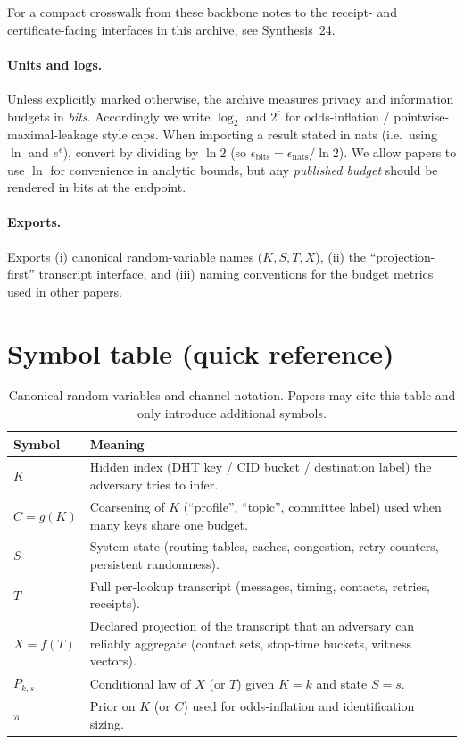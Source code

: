 \documentclass[11pt]{article}
\begin{document}
\noindent For a compact crosswalk from these backbone notes to the receipt- and certificate-facing interfaces in this archive, see Synthesis~24.\cite{series:mathcrosswalk}

\paragraph{Units and logs.}
Unless explicitly marked otherwise, the archive measures privacy and information budgets in \emph{bits}.
Accordingly we write $\log_2$ and $2^{\epsilon}$ for odds-inflation / pointwise-maximal-leakage style caps.
When importing a result stated in nats (i.e.\ using $\ln$ and $e^{\epsilon}$), convert by dividing by $\ln 2$ (so $\epsilon_{\mathrm{bits}}=\epsilon_{\mathrm{nats}}/\ln 2$).
We allow papers to use $\ln$ for convenience in analytic bounds, but any \emph{published budget} should be rendered in bits at the endpoint.

\paragraph{Exports.}
Exports (i) canonical random-variable names ($K,S,T,X$), (ii) the ``projection-first'' transcript interface, and (iii) naming conventions for the budget metrics used in other papers.

\section{Symbol table (quick reference)}
\begin{table}[t]
\centering
\begin{tabularx}{\linewidth}{@{}lX@{}}
\toprule
Symbol & Meaning \\
\midrule
$K$ & Hidden index (DHT key / CID bucket / destination label) the adversary tries to infer. \\
$C=g(K)$ & Coarsening of $K$ (``profile'', ``topic'', committee label) used when many keys share one budget. \\
$S$ & System state (routing tables, caches, congestion, retry counters, persistent randomness). \\
$T$ & Full per-lookup transcript (messages, timing, contacts, retries, receipts). \\
$X=f(T)$ & Declared projection of the transcript that an adversary can reliably aggregate (contact sets, stop-time buckets, witness vectors). \\
$P_{k,s}$ & Conditional law of $X$ (or $T$) given $K=k$ and state $S=s$. \\
$\pi$ & Prior on $K$ (or $C$) used for odds-inflation and identification sizing. \\
\bottomrule
\end{tabularx}
\caption{Canonical random variables and channel notation. Papers may cite this table and only introduce additional symbols.}
\label{tab:symbols}
\end{table}
\end{document}
